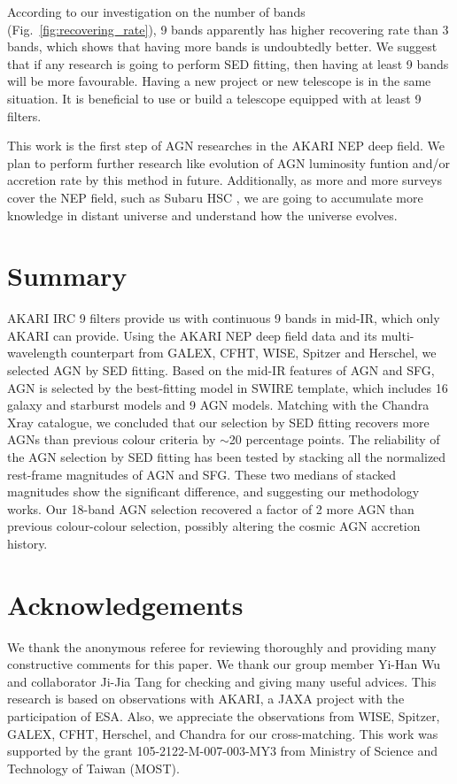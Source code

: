 \documentclass[a4paper,fleqn,usenatbib]{mnras}
\begin{document}
According to our investigation on the number of bands (Fig.~\ref{fig:recovering_rate}), 9 bands apparently has higher recovering rate than 3 bands, which shows that having more bands is  undoubtedly better. We suggest that if any research is going to perform SED fitting, then having at least 9 bands will be more favourable. Having a new project or new telescope is in the same situation. It is beneficial to use or build a telescope equipped with at least 9 filters.    

This work is the first step of AGN researches in the AKARI NEP deep field. We plan to perform further research like evolution of AGN luminosity funtion and/or accretion rate by this method in future. Additionally, as more and more surveys cover the NEP field, such as Subaru HSC \citep{Goto et al. 2017}, we are going to accumulate more knowledge in distant universe and understand how the universe evolves.   


\section{Summary}
\label{summary}
AKARI IRC 9 filters provide us with continuous 9 bands in mid-IR, which only AKARI can provide. Using the AKARI NEP deep field data and its multi-wavelength counterpart from GALEX, CFHT, WISE, Spitzer and Herschel, we selected AGN by SED fitting. Based on the mid-IR features of AGN and SFG, AGN is selected by the best-fitting model in SWIRE template, which includes 16 galaxy and starburst models and 9 AGN models. Matching with the Chandra Xray catalogue, we concluded that our selection by SED fitting recovers more AGNs than previous colour criteria by $\sim$20 percentage points. The reliability of the AGN selection by SED fitting has been tested by stacking all the normalized rest-frame magnitudes of AGN and SFG. These two medians of stacked magnitudes show the significant difference, and suggesting our methodology works. Our 18-band AGN selection recovered a factor of 2 more AGN than previous colour-colour selection, possibly altering the cosmic AGN accretion history.   


\section*{Acknowledgements}
We thank the anonymous referee for reviewing thoroughly and providing many constructive comments for this paper. We thank our group member Yi-Han Wu and collaborator Ji-Jia Tang for checking and giving many useful advices. This research is based on observations with AKARI, a JAXA project with the participation of ESA. Also, we appreciate the observations from WISE, Spitzer, GALEX, CFHT, Herschel, and Chandra for our cross-matching. This work was supported by the grant 105-2122-M-007-003-MY3 from Ministry of Science and Technology of Taiwan (MOST).
\end{document}
